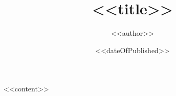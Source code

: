 \documentclass[12pt, b6paper, openany]{memoir}
\author{<<author>>}
\title{<<title>>}
\date{<<dateOfPublished>>}
\begin{document}
	\frontmatter
		\begin{titlingpage}
		\maketitle
		\end{titlingpage}
		\tableofcontents

	\mainmatter
<<content>>
	\appendix
	\backmatter
\end{document}
